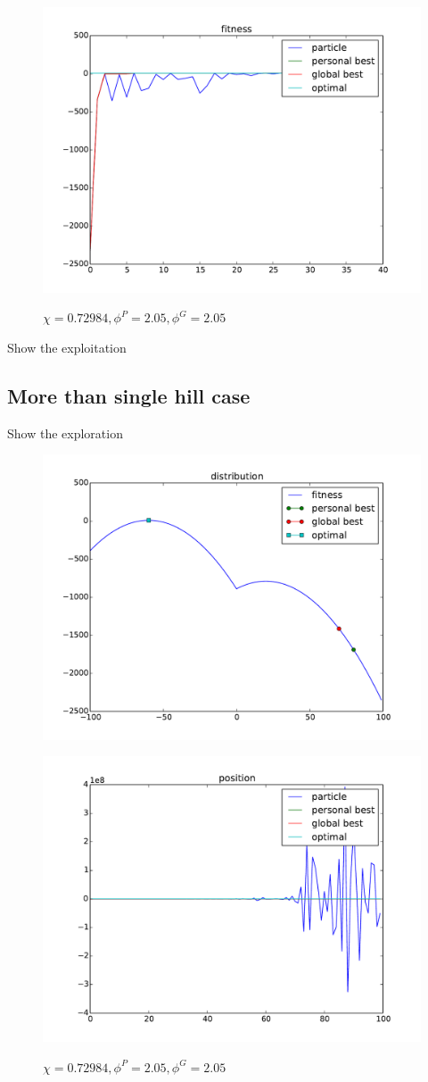 \begin{figure}[ht]
\centering
\includegraphics[width=.7\linewidth]{./simfig/case1/fitness1-2} 
\label{fig:case1-2:fitness} 
\caption{$ \chi = 0.72984 , \phi^{P} = 2.05 , \phi^{G} = 2.05 $ }
\end{figure}

Show the exploitation


\subsection{More than single hill case}

Show the exploration



\begin{figure}[ht]
\centering
\includegraphics[width=.7\linewidth]{./simfig/case2/distribution2}
\label{fig:case2-1:distribution} 
\end{figure}

\begin{figure}[ht]
\centering
\includegraphics[width=.7\linewidth]{./simfig/case2/position2-1} 
\label{fig:case2-1:position}
\caption{$ \chi = 0.72984 , \phi^{P} = 2.05 , \phi^{G} = 2.05 $ }
\end{figure}

